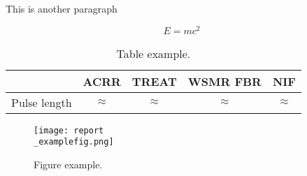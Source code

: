 \documentclass[12pt] {article}
\begin{document}
This is another paragraph

\begin{equation}\label{exampleequation}
E = mc^2
\end{equation}

\begin{table}[h]
\begin{center}
\caption{\label{exampletable}Table example.}
\begin{tabular}{ l c c c c}
\hline
\hline
                            &            ACRR               &           TREAT                  &         WSMR FBR           &         NIF  \\

\hline

Pulse length           &  $\approx$   &  $\approx$  &    $\approx$      &  $\approx$ \\
\hline
\hline
\end{tabular}
\end{center}
\end{table}


\begin{figure}[H]
\begin{center}
               \texttt{[image: report\\\_examplefig.png]}
               \caption{\label{examplefigure}Figure example.}
\end{center}
\end{figure}












\newpage


% 
\end{document}
